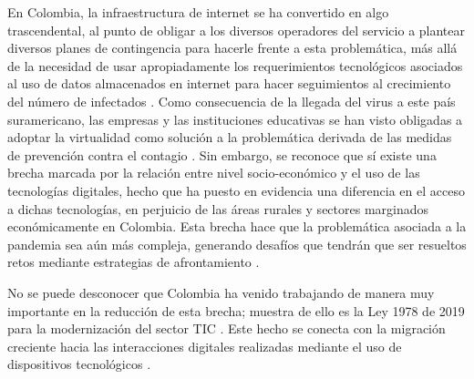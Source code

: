\documentclass[spanish]{textolivre}
\begin{document}
En Colombia, la infraestructura de internet se ha convertido en algo trascendental, al punto de obligar a los diversos operadores del servicio a plantear diversos planes de contingencia para hacerle frente a esta problemática, más allá de la necesidad de usar apropiadamente los requerimientos tecnológicos asociados al uso de datos almacenados en internet para hacer seguimientos al crecimiento del número de infectados \cite{ortiz-martinez2020}. Como consecuencia de la llegada del virus a este país suramericano, las empresas y las instituciones educativas se han visto obligadas a adoptar la virtualidad como solución a la problemática derivada de las medidas de prevención contra el contagio \cite{martinez_nieto2021}. Sin embargo, se reconoce que sí existe una brecha marcada por la relación entre nivel socio-económico y el uso de las tecnologías digitales, hecho que ha puesto en evidencia una diferencia en el acceso a dichas tecnologías, en perjuicio de las áreas rurales y sectores marginados económicamente en Colombia. Esta brecha hace que la problemática asociada a la pandemia sea aún más compleja, generando desafíos que tendrán que ser resueltos retos mediante estrategias de afrontamiento \cite{cediel2020}.

No se puede desconocer que Colombia ha venido trabajando de manera muy importante en la reducción de esta brecha; muestra de ello es la Ley 1978 de 2019 para la modernización del sector TIC \cite{restrepo_tamayo2020}. Este hecho se conecta con la migración creciente hacia las interacciones digitales realizadas mediante el uso de dispositivos tecnológicos \cite{livari2020}.
\end{document}
